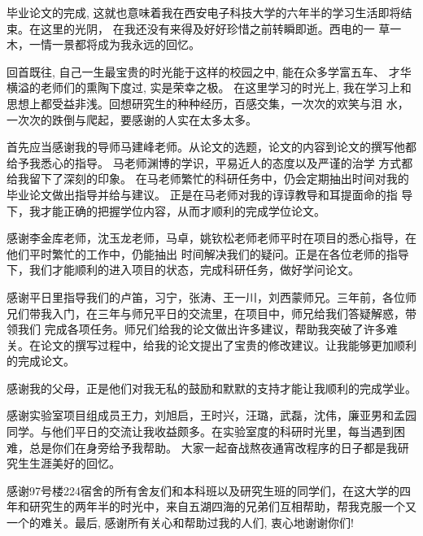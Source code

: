 
\begin{acknowledgments}

毕业论文的完成, 这就也意味着我在西安电子科技大学的六年半的学习生活即将结束。在这里的光阴，
在我还没有来得及好好珍惜之前转瞬即逝。西电的一 草一木，一情一景都将成为我永远的回忆。

回首既往, 自己一生最宝贵的时光能于这样的校园之中, 能在众多学富五车、 才华横溢的老师们的熏陶下度过, 实是荣幸之极。
在这里学习的时光上, 我在学习上和思想上都受益非浅。回想研究生的种种经历，百感交集，一次次的欢笑与泪 水，一次次的跌倒与爬起，要感谢的人实在太多太多。 
 
首先应当感谢我的导师马建峰老师。从论文的选题，论文的内容到论文的撰写他都给予我悉心的指导。
马老师渊博的学识，平易近人的态度以及严谨的治学 方式都给我留下了深刻的印象。
在马老师繁忙的科研任务中，仍会定期抽出时间对我的毕业论文做出指导并给与建议。
正是在马老师对我的谆谆教导和耳提面命的指 导下，我才能正确的把握学位内容，从而才顺利的完成学位论文。 

感谢李金库老师，沈玉龙老师，马卓，姚钦松老师老师平时在项目的悉心指导，在他们平时繁忙的工作中，仍能抽出
时间解决我们的疑问。正是在各位老师的指导下，我们才能顺利的进入项目的状态，完成科研任务，做好学问论文。
 
感谢平日里指导我们的卢笛，习宁，张涛、王一川，刘西蒙师兄。三年前，各位师兄们带我入门，在三年与师兄平日的交流里，在项目中，师兄给我们答疑解惑，带领我们
完成各项任务。师兄们给我的论文做出许多建议，帮助我突破了许多难关。在论文的撰写过程中，给我的论文提出了宝贵的修改建议。让我能够更加顺利的完成论文。 
 
感谢我的父母，正是他们对我无私的鼓励和默默的支持才能让我顺利的完成学业。
 
 感谢实验室项目组成员王力，刘旭启，王时兴，汪璐，武磊，沈伟，廉亚男和孟园同学。与他们平日的交流让我收益颇多。在实验室度的科研时光里，每当遇到困难，总是你们在身旁给予我帮助。
 大家一起奋战熬夜通宵改程序的日子都是我研究生生涯美好的回忆。 
  
 感谢97号楼224宿舍的所有舍友们和本科班以及研究生班的同学们，在这大学的四年和研究生的两年半的时光中，来自五湖四海的兄弟们互相帮助，帮我克服一个又一个的难关。最后, 感谢所有关心和帮助过我的人们, 衷心地谢谢你们!

\end{acknowledgments}


